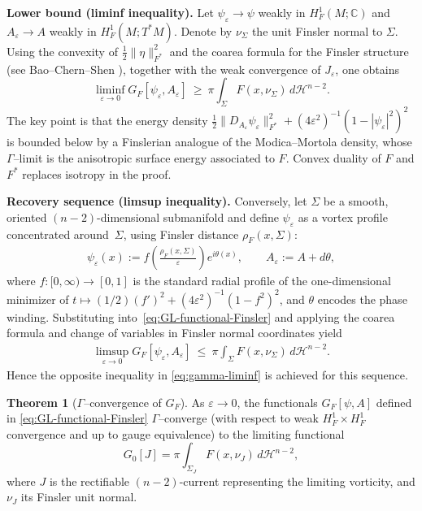 \documentclass[fleqn,11pt,twoside]{article}
\theoremstyle{definition}
\newtheorem{theorem}{Theorem}
\begin{document}
\medskip
\noindent\textbf{Lower bound (liminf inequality).}
Let $\psi_\varepsilon\to \psi$ weakly in $H^1_F(M;\mathbb{C})$
and $A_\varepsilon\to A$ weakly in $H^1_F(M;T^*M)$.
Denote by $\nu_\Sigma$ the unit Finsler normal to $\Sigma$.
Using the convexity of $\frac 12\|\eta\|_{F^*}^2$ and the coarea
formula for the Finsler structure 
(see Bao--Chern--Shen \cite{BaoChernShen2000}),
together with the weak convergence of $J_\varepsilon$, one obtains
\begin{equation}\label{eq:gamma-liminf}
\liminf_{\varepsilon\to 0} G_F[\psi_\varepsilon,A_\varepsilon]
\ \ge\ \pi \int_{\Sigma} F(x,\nu_\Sigma)\, d\mathcal{H}^{n-2}.
\end{equation}
The key point is that the energy density
$\frac 12\|D_{A_\varepsilon}\psi_\varepsilon\|_{F^*}^2
 + (4\varepsilon^2)^{-1}(1-|\psi_\varepsilon|^2)^2$
is bounded below by a Finslerian analogue of the Modica–Mortola density, whose $\Gamma$--limit is the anisotropic surface energy associated to $F$. Convex duality of $F$ and $F^*$ replaces isotropy in the proof.

\medskip
\noindent\textbf{Recovery sequence (limsup inequality).}
Conversely, let $\Sigma$ be a smooth, oriented $(n-2)$-dimensional submanifold and define $\psi_\varepsilon$ as a vortex profile concentrated around~$\Sigma$, using Finsler distance $\rho_F(x,\Sigma)$:
\begin{align*}
\psi_\varepsilon(x):= f\!\left(\frac{\rho_F(x,\Sigma)}{\varepsilon}\right)e^{i\theta(x)},
\qquad A_\varepsilon := A + d\theta,
\end{align*}
where $f:[0,\infty)\to[0,1]$ is the standard radial profile
of the one-dimensional minimizer of
$t\mapsto (1/2)(f')^2+(4\varepsilon^2)^{-1}(1-f^2)^2$,
and $\theta$ encodes the phase winding.
Substituting into~\eqref{eq:GL-functional-Finsler} and applying the
coarea formula and change of variables in Finsler normal coordinates yield
\begin{align*}
\limsup_{\varepsilon\to 0} G_F[\psi_\varepsilon,A_\varepsilon]
\ \le\ \pi \int_{\Sigma} F(x,\nu_\Sigma)\, d\mathcal{H}^{n-2}.
\end{align*}
Hence the opposite inequality in \eqref{eq:gamma-liminf} is achieved for this sequence.

\begin{theorem}[$\Gamma$--convergence of $G_F$]
\label{thm:GammaConv}
As $\varepsilon\to 0$, the functionals $G_F[\psi,A]$ defined in
\eqref{eq:GL-functional-Finsler} $\Gamma$--converge (with respect to weak $H^1_F\times H^1_F$ convergence and up to gauge equivalence) to the limiting functional
\begin{equation}\label{eq:limit-functional}
  G_0[J]
  = \pi \int_{\Sigma_J} F(x,\nu_J)\, d\mathcal{H}^{n-2},
\end{equation}
where $J$ is the rectifiable $(n-2)$-current representing the limiting vorticity, and $\nu_J$ its Finsler unit normal.
\end{theorem}
\end{document}
